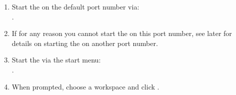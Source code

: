 \begin{enumerate}
\item Start the \gdagent on the default port number via:\\ .  
\item If for any reason you cannot start the \gdagent on this port number, see later  for details on starting the \gdagent on another port number. 
\item Start the \ite{} via the start menu:\\ \bxmenu{\app{}}{\app{}}{}. 
\item When prompted, choose a workspace and click . 
\end{enumerate}
